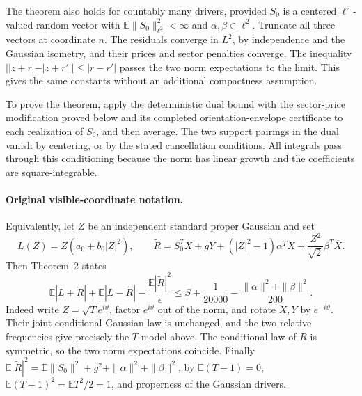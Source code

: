 The theorem also holds for countably many drivers, provided
$S_0$ is a centered $\ell^2$-valued random vector with
$\mathbb E\|S_0\|_{\ell^2}^2<\infty$ and
$\alpha,\beta\in\ell^2$.  Truncate all three vectors at coordinate $n$.
The residuals converge in $L^2$, by independence and the Gaussian isometry,
and their prices and sector penalties converge.  The inequality
$||z+r|-|z+r'||\le|r-r'|$ passes the two norm expectations to the limit.
This gives the same constants without an additional compactness assumption.

To prove the theorem, apply the deterministic dual bound with the
sector-price modification proved below and its completed orientation-envelope
certificate to each realization of $S_0$, and then average.  The two support pairings in the
dual vanish by centering, or by the stated cancellation conditions.
All integrals pass through this conditioning because the norm has linear
growth and the coefficients are square-integrable.

\paragraph{Original visible-coordinate notation.}
Equivalently, let $Z$ be an independent standard proper Gaussian and set
\[
 L(Z)=Z(a_0+b_0|Z|^2),\qquad
 \widetilde R=S_0^TX+gY+(|Z|^2-1)\alpha^TX
                       +\frac{Z^2}{\sqrt2}\beta^T\overline X.
\]
Then Theorem~2 states
\[
 \mathbb E|L+\widetilde R|+\mathbb E|L-\widetilde R|
 -\frac{\mathbb E|\widetilde R|^2}{\epsilon}
 \le S+\frac1{20000}-\frac{\|\alpha\|^2+\|\beta\|^2}{200}.
\]
Indeed write $Z=\sqrt T e^{i\vartheta}$, factor $e^{i\vartheta}$ out of
the norm, and rotate $X,Y$ by $e^{-i\vartheta}$.  Their joint conditional
Gaussian law is unchanged, and the two relative frequencies give precisely
the $T$-model above.  The conditional law of $R$ is symmetric, so the two
norm expectations coincide.  Finally
$\mathbb E|\widetilde R|^2=\mathbb E\|S_0\|^2+g^2+
\|\alpha\|^2+\|\beta\|^2$, by $\mathbb E(T-1)=0$,
$\mathbb E(T-1)^2=\mathbb ET^2/2=1$, and properness of the Gaussian drivers.

